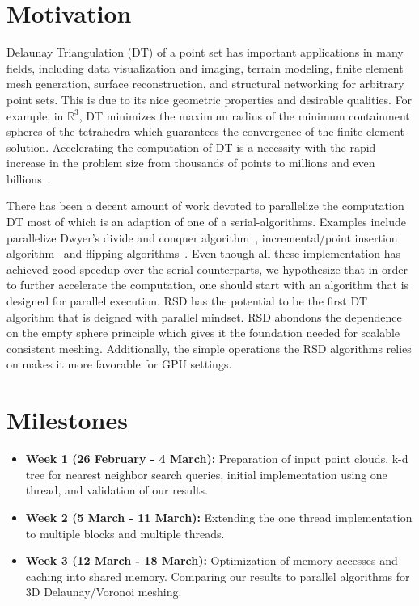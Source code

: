\documentclass[12pt] {article}
\begin{document}
\section*{Motivation}
Delaunay Triangulation (DT) of a point set has important applications in many fields, including data visualization and imaging, terrain modeling, finite element mesh generation, surface reconstruction, and structural networking for arbitrary point sets. This is due to its nice geometric properties and desirable qualities. For example, in $\mathbb{R}^{3}$, DT minimizes the maximum radius of the minimum containment spheres of the tetrahedra which guarantees the convergence of the finite element solution. Accelerating the computation of DT is a necessity with the rapid increase in the problem size from thousands of points to millions and even billions~\citep{lo20153d}. 

There has been a decent amount of work devoted to parallelize the computation DT most of which is an adaption of one of a serial-algorithms. Examples include parallelize Dwyer's divide and conquer algorithm~\citep{fuetterling2014high, cignoni1998dewall, 574023, lo20153d}, incremental/point insertion algorithm~\citep{cao2014gpu, batista2010parallel} and flipping algorithms~\citep{liparulo2015fuzzy}. Even though all these implementation has achieved good speedup over the serial counterparts, we hypothesize that in order to further accelerate the computation, one should start with an algorithm that is designed for parallel execution. RSD has the potential to be the first DT algorithm that is deigned with parallel mindset. RSD abondons the dependence on the empty sphere principle which gives it the foundation needed for scalable consistent meshing. Additionally, the simple operations the RSD algorithms relies on makes it more favorable for GPU settings. 



\section*{Milestones}
\begin{itemize}
\item \textbf{Week 1 (26 February - 4 March):} Preparation of input point clouds, k-d tree for nearest neighbor search queries, initial implementation using one thread, and validation of our results.   
\item \textbf{Week 2 (5 March - 11 March):}  Extending the one thread implementation to multiple blocks and multiple threads. 
\item \textbf{Week 3 (12 March - 18 March):} Optimization of memory accesses and caching into shared memory. Comparing our results to parallel algorithms for 3D Delaunay/Voronoi meshing.   
 
\end{itemize}
\end{document}

